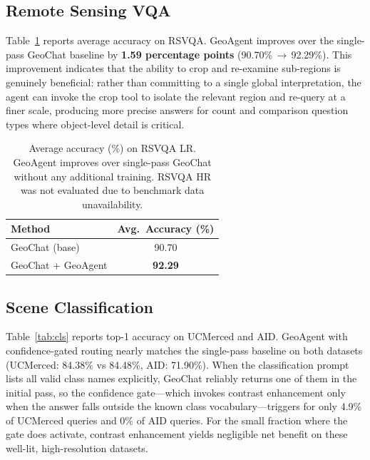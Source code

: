 \documentclass{article}
\begin{document}
\subsection{Remote Sensing VQA}

Table~\ref{tab:rsvqa} reports average accuracy on RSVQA.  GeoAgent improves over
the single-pass GeoChat baseline by \textbf{1.59 percentage points}
(90.70\%\,$\to$\,92.29\%).  This improvement indicates that the ability to crop and
re-examine sub-regions is genuinely beneficial: rather than committing to a single
global interpretation, the agent can invoke the crop tool to isolate the relevant
region and re-query at a finer scale, producing more precise answers for count and
comparison question types where object-level detail is critical.

\begin{table}[t]
  \caption{Average accuracy (\%) on RSVQA LR.  GeoAgent improves
    over single-pass GeoChat without any additional training.  RSVQA HR was
    not evaluated due to benchmark data unavailability.}
  \label{tab:rsvqa}
  \centering
  \begin{tabular}{lc}
    \toprule
    \textbf{Method} & \textbf{Avg.\ Accuracy (\%)} \\
    \midrule
    GeoChat (base)       & 90.70 \\
    GeoChat + GeoAgent   & \textbf{92.29} \\
    \bottomrule
  \end{tabular}
\end{table}

\subsection{Scene Classification}

Table~\ref{tab:cls} reports top-1 accuracy on UCMerced and AID.  GeoAgent
with confidence-gated routing nearly matches the single-pass baseline on both
datasets (UCMerced: 84.38\% vs 84.48\%, AID: 71.90\%).  When the classification
prompt lists all valid class names explicitly, GeoChat reliably returns one of
them in the initial pass, so the confidence gate---which invokes contrast
enhancement only when the answer falls outside the known class vocabulary---triggers
for only 4.9\% of UCMerced queries and 0\% of AID queries.  For the small fraction
where the gate does activate, contrast enhancement yields negligible net benefit
on these well-lit, high-resolution datasets.
\end{document}
